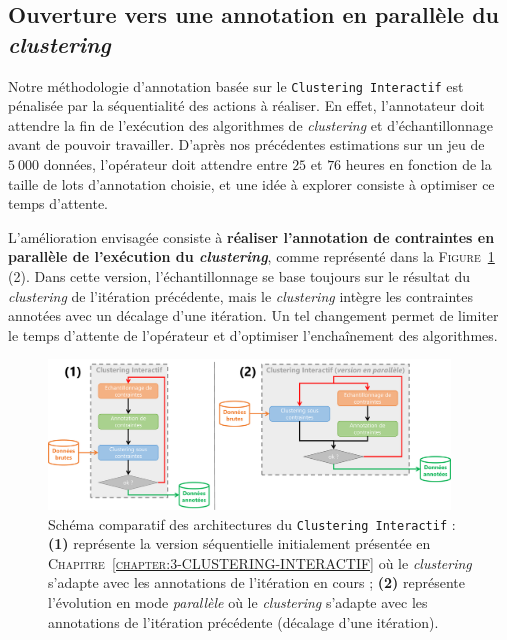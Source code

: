 		\subsection{Ouverture vers une annotation en parallèle du \textit{clustering}}
		
			Notre méthodologie d'annotation basée sur le \texttt{Clustering Interactif} est pénalisée par la séquentialité des actions à réaliser.
			En effet, l'annotateur doit attendre la fin de l'exécution des algorithmes de \textit{clustering} et d'échantillonnage avant de pouvoir travailler.
			D'après nos précédentes estimations sur un jeu de $5~000$ données, l'opérateur doit attendre entre $25$ et $76$ heures en fonction de la taille de lots d'annotation choisie, et une idée à explorer consiste à optimiser ce temps d'attente.
			
			L'amélioration envisagée consiste à \textbf{réaliser l'annotation de contraintes en parallèle de l'exécution du \textit{clustering}}, comme représenté dans la \textsc{Figure~\ref{figure:4.3.4-ETUDE-COUT-TOTAL-ARCHITECTURE}} (2).
			Dans cette version, l'échantillonnage se base toujours sur le résultat du \textit{clustering} de l'itération précédente, mais le \textit{clustering} intègre les contraintes annotées avec un décalage d'une itération.
			Un tel changement permet de limiter le temps d'attente de l'opérateur et d'optimiser l'enchaînement des algorithmes.

			\begin{figure}[!htb]
				\centering
				\includegraphics[width=0.95\textwidth]{figures/interactive-clustering-architecture-sequentielle-vs-parallele}
				\caption{
					Schéma comparatif des architectures du \texttt{Clustering Interactif} : \textbf{(1)} représente la version séquentielle initialement présentée en \textsc{Chapitre~\ref{chapter:3-CLUSTERING-INTERACTIF}} où le \textit{clustering} s'adapte avec les annotations de l'itération en cours ; \textbf{(2)} représente l'évolution en mode \textit{parallèle} où le \textit{clustering} s'adapte avec les annotations de l'itération précédente (décalage d'une itération).
				}
				\label{figure:4.3.4-ETUDE-COUT-TOTAL-ARCHITECTURE}
			\end{figure}
			
